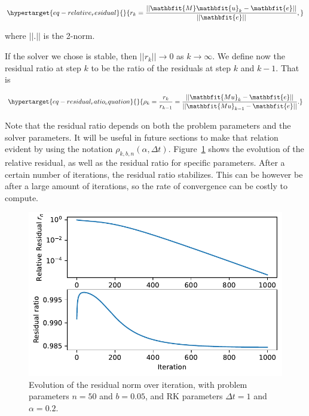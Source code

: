\documentclass[
  letterpaper,
]{report}
\theoremstyle{plain}
\theoremstyle{definition}
\theoremstyle{definition}
\theoremstyle{remark}
\begin{document}
\begin{equation}\protect\hypertarget{eq-relative_residual}{}{
r_k = \frac{||\mathbfit{M}\mathbfit{u}_k - \mathbfit{e}||}{||\mathbfit{e}||},
}\label{eq-relative_residual}\end{equation}

where \(||.||\) is the 2-norm.

If the solver we chose is stable, then \(||r_k|| \to 0\) as
\(k \to \infty\). We define now the residual ratio at step \(k\) to be
the ratio of the residuals at step \(k\) and \(k-1\). That is

\begin{equation}\protect\hypertarget{eq-residual_ratio_equation}{}{
\rho_k = \frac{r_k}{r_{k-1}} = \frac{||\mathbfit{Mu}_k - \mathbfit{e}||}{||\mathbfit{Mu}_{k-1}-\mathbfit{e}||}.
}\label{eq-residual_ratio_equation}\end{equation}

Note that the residual ratio depends on both the problem parameters and
the solver parameters. It will be useful in future sections to make that
relation evident by using the notation
\(\rho_{k,b,n}(\alpha, \Delta t)\).
Figure~\ref{fig-residual_ratio_evolution} shows the evolution of the
relative residual, as well as the residual ratio for specific
parameters. After a certain number of iterations, the residual ratio
stabilizes. This can be however be after a large amount of iterations,
so the rate of convergence can be costly to compute.

\begin{figure}

{\centering \includegraphics{./5_solverExploration_files/figure-pdf/fig-residual_ratio_evolution-output-1.pdf}

}

\caption{\label{fig-residual_ratio_evolution}Evolution of the residual
norm over iteration, with problem parameters \(n = 50\) and
\(b = 0.05\), and RK parameters \(\Delta t = 1\) and \(\alpha = 0.2\).}

\end{figure}
\end{document}
